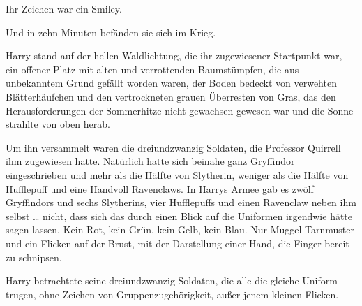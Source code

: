 Ihr Zeichen war ein Smiley.

Und in zehn Minuten befänden sie sich im Krieg.

Harry stand auf der hellen Waldlichtung, die ihr zugewiesener Startpunkt war, ein offener Platz mit alten und verrottenden Baumstümpfen, die aus unbekanntem Grund gefällt worden waren, der Boden bedeckt von verwehten Blätterhäufchen und den vertrockneten grauen Überresten von Gras, das den Herausforderungen der Sommerhitze nicht gewachsen gewesen war und die Sonne strahlte von oben herab.

Um ihn versammelt waren die dreiundzwanzig Soldaten, die Professor Quirrell ihm zugewiesen hatte. Natürlich hatte sich beinahe ganz Gryffindor eingeschrieben und mehr als die Hälfte von Slytherin, weniger als die Hälfte von Hufflepuff und eine Handvoll Ravenclaws. In Harrys Armee gab es zwölf Gryffindors und sechs Slytherins, vier Hufflepuffs und einen Ravenclaw neben ihm selbst … nicht, dass sich das durch einen Blick auf die Uniformen irgendwie hätte sagen lassen. Kein Rot, kein Grün, kein Gelb, kein Blau. Nur Muggel-Tarnmuster und ein Flicken auf der Brust, mit der Darstellung einer Hand, die Finger bereit zu schnipsen.

Harry betrachtete seine dreiundzwanzig Soldaten, die alle die gleiche Uniform trugen, ohne Zeichen von Gruppenzugehörigkeit, außer jenem kleinen Flicken.

